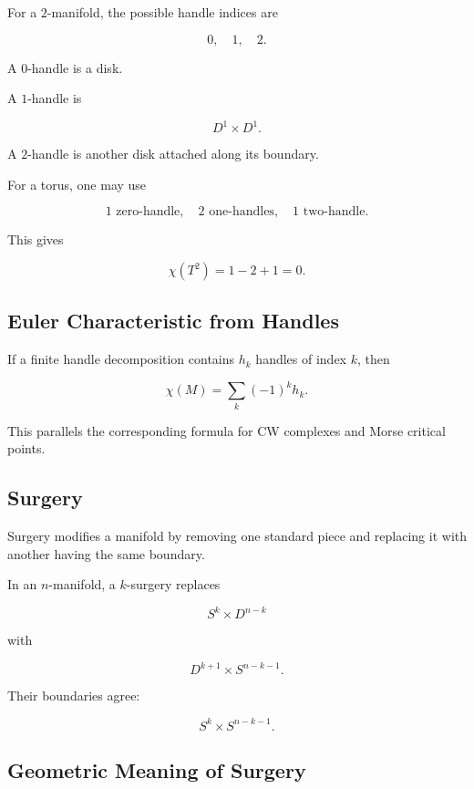 For a \(2\)-manifold, the possible handle indices are

\[
\boxed{
0,\quad1,\quad2.
}
\]

A \(0\)-handle is a disk.

A \(1\)-handle is

\[
D^1\times D^1.
\]

A \(2\)-handle is another disk attached along its boundary.

For a torus, one may use

\[
\boxed{
1\text{ zero-handle},
\quad
2\text{ one-handles},
\quad
1\text{ two-handle}.
}
\]

This gives

\[
\chi(T^2)=1-2+1=0.
\]

\subsection{Euler Characteristic from Handles}
\label{subsec:euler-from-handles}

If a finite handle decomposition contains \(h_k\) handles of index \(k\),
then

\[
\boxed{
\chi(M)
=
\sum_k(-1)^kh_k.
}
\]

This parallels the corresponding formula for CW complexes and Morse
critical points.

\subsection{Surgery}
\label{subsec:topological-surgery}

Surgery modifies a manifold by removing one standard piece and replacing it
with another having the same boundary.

In an \(n\)-manifold, a \(k\)-surgery replaces

\[
\boxed{
S^k\times D^{n-k}
}
\]

with

\[
\boxed{
D^{k+1}\times S^{n-k-1}.
}
\]

Their boundaries agree:

\[
\boxed{
S^k\times S^{n-k-1}.
}
\]

\subsection{Geometric Meaning of Surgery}
\label{subsec:geometric-meaning-surgery}

